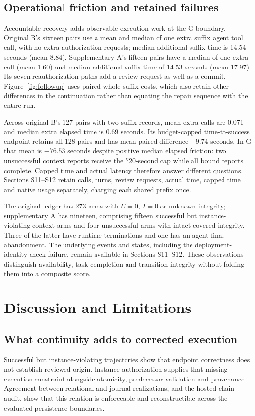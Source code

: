 \documentclass[10pt,a4paper,twocolumn]{article}
\begin{document}
\subsection{Operational friction and retained failures}
Accountable recovery adds observable execution work at the G boundary. Original B's sixteen pairs use a mean and median of one extra suffix agent tool call, with no extra authorization requests; median additional suffix time is 14.54 seconds (mean 8.84). Supplementary A's fifteen pairs have a median of one extra call (mean 1.60) and median additional suffix time of 14.53 seconds (mean 17.97). Its seven reauthorization paths add a review request as well as a commit. Figure~\ref{fig:followup} uses paired whole-suffix costs, which also retain other differences in the continuation rather than equating the repair sequence with the entire run.

Across original B's 127 pairs with two suffix records, mean extra calls are 0.071 and median extra elapsed time is 0.69 seconds. Its budget-capped time-to-success endpoint retains all 128 pairs and has mean paired difference $-9.74$ seconds. In G that mean is $-76.53$ seconds despite positive median elapsed friction: two unsuccessful context reports receive the 720-second cap while all bound reports complete. Capped time and actual latency therefore answer different questions. Sections S11--S12 retain calls, turns, review requests, actual time, capped time and native usage separately, charging each shared prefix once.

The original ledger has 273 arms with $U=0$, $I=0$ or unknown integrity; supplementary A has nineteen, comprising fifteen successful but instance-violating context arms and four unsuccessful arms with intact covered integrity. Three of the latter have runtime terminations and one has an agent-final abandonment. The underlying events and states, including the deployment-identity check failure, remain available in Sections S11--S12. These observations distinguish availability, task completion and transition integrity without folding them into a composite score.

\section{Discussion and Limitations}
\subsection{What continuity adds to corrected execution}
Successful but instance-violating trajectories show that endpoint correctness does not establish reviewed origin. Instance authorization supplies that missing execution constraint alongside atomicity, predecessor validation and provenance. Agreement between relational and journal realizations, and the hosted-chain audit, show that this relation is enforceable and reconstructible across the evaluated persistence boundaries.
\end{document}
